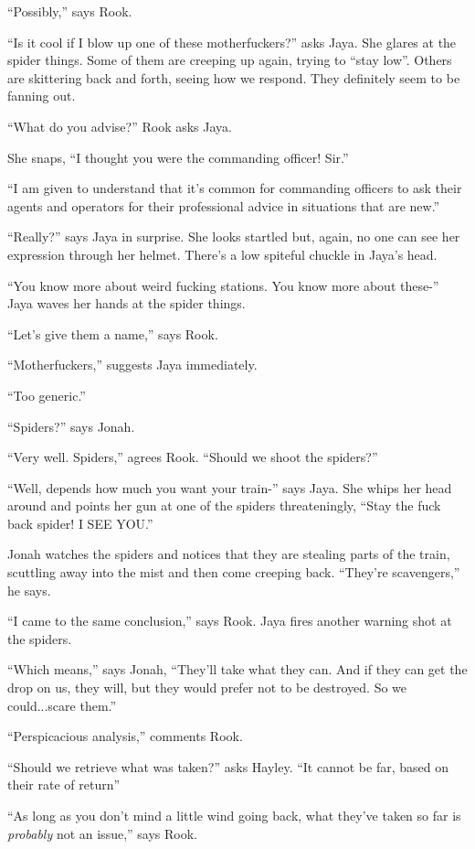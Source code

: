 ``Possibly,'' says Rook.

``Is it cool if I blow up one of these motherfuckers?'' asks Jaya.  She glares at the spider things. Some of them are creeping up again, trying to ``stay low''. Others are skittering back and forth, seeing how we respond.  They definitely seem to be fanning out.

``What do you advise?'' Rook asks Jaya.

She snaps, ``I thought you were the commanding officer!  Sir.''

``I am given to understand that it's common for commanding officers to ask their agents and operators for their professional advice in situations that are new.''

``Really?'' says Jaya in surprise.  She looks startled but, again, no one can see her expression through her helmet.  There's a low spiteful chuckle in Jaya's head.

``You know more about weird fucking stations.  You know more about these-'' Jaya waves her hands at the spider things.

``Let's give them a name,'' says Rook.

``Motherfuckers,'' suggests Jaya immediately.

``Too generic.''

``Spiders?'' says Jonah.

``Very well.  Spiders,'' agrees Rook.  ``Should we shoot the spiders?''

``Well, depends how much you want your train-'' says Jaya.  She whips her head around and points her gun at one of the spiders threateningly, ``Stay the fuck back spider!  I SEE YOU.''



Jonah watches the spiders and notices that they are stealing parts of the train, scuttling away into the mist and then come creeping back. ``They're scavengers,'' he says.

``I came to the same conclusion,'' says Rook.  Jaya fires another warning shot at the spiders.

``Which means,'' says Jonah, ``They'll take what they can.  And if they can get the drop on us, they will, but they would prefer not to be destroyed. So we could...scare them.''

``Perspicacious analysis,'' comments Rook.

``Should we retrieve what was taken?'' asks Hayley.  ``It cannot be far, based on their rate of return''

``As long as you don't mind a little wind going back, what they've taken so far is \textit{probably }not an issue,'' says Rook.

